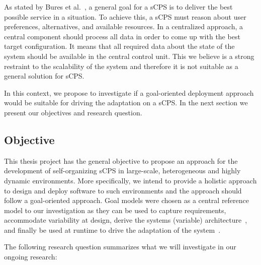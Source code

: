 As stated by Bures et al.~\cite{bures_software_2015}, a general goal for a sCPS is to deliver the best possible service in a situation. To achieve this, a sCPS must reason about user preferences, alternatives, and available resources. In a centralized approach, a central component should process all data in order to come up with the best target configuration. It means that all required data about the state of the system should be available in the central control unit. This we believe is a strong restraint to the scalability of the system and therefore it is not suitable as a general solution for sCPS.
 

In this context, we propose to investigate if a goal-oriented deployment approach would be suitable for driving the adaptation on a sCPS. In the next section we present our objectives and research question. 

%
%

\subsection{Objective}
\label{sec:objective}

This thesis project has the general objective to propose an approach for the development of self-organizing sCPS in large-scale, heterogeneous and highly dynamic environments. More specifically, we intend to provide a holistic approach to design and deploy software to such environments and the approach should follow a goal-oriented approach. Goal models were chosen as a central reference model to our investigation as they can be used to capture requirements, accommodate variability at design, derive the systems (variable) architecture~\cite{angelopoulos_capturing_2015,van_lamsweerde_system_2003,yu_goals_2008}, and finally be used at runtime to drive the adaptation of the system~\cite{cailliau_runtime_2017,felix_solano_taming_2019}. 


The following research question summarizes what we will investigate in our ongoing research:

